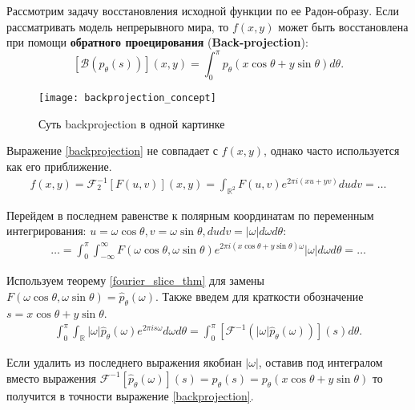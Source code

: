 
Рассмотрим задачу восстановления исходной функции по ее Радон-образу. Если рассматривать модель непрерывного мира, то $f(x, y)$ может быть восстановлена при помощи \textbf{обратного проецирования} (\textbf{Back-projection}):
\begin{equation}
\label{backprojection}
    \left[ \mathcal{B}(p_\theta(s)) \right](x, y) = \int_0^{\pi} p_\theta\left( x\cos\theta + y\sin\theta \right) d\theta.
\end{equation}

\begin{figure}[!h]
    \centering
    \texttt{[image: backprojection\_concept]}
    \caption{Суть backprojection в одной картинке}
\end{figure}

Выражение \eqref{backprojection} не совпадает с $f(x, y)$, однако часто используется как его приближение.
\begin{gather*}
    f(x, y) =
    \mathcal{F}_2^{-1} \left[ F(u, v) \right](x, y) =
    \int_{\mathbb{R}^2} F(u, v) e^{2\pi i (xu + yv)} du dv = \dots
\end{gather*}

Перейдем в последнем равенстве к полярным координатам по переменным интегрирования: $u = \omega\cos\theta, v = \omega\sin\theta, du dv = |\omega| d\omega d\theta$:
\begin{gather*}
    \dots =
    \int_{0}^{\pi} \int_{-\infty}^{\infty} F(\omega\cos\theta, \omega\sin\theta) e^{2\pi i \left( x \cos\theta + y\sin\theta \right)\omega} |\omega| d\omega d \theta = \dots
\end{gather*}

Используем теорему \ref{fourier_slice_thm} для замены $F(\omega\cos\theta, \omega\sin\theta) = \hat{p}_{\theta}(\omega)$. Также введем для краткости обозначение $s = x\cos\theta + y\sin\theta$.
\begin{gather*}
    \int_{0}^{\pi} \int_{\mathbb{R}} |\omega| \hat{p}_{\theta}(\omega) e^{2\pi i s \omega} d\omega d\theta =
    \int_{0}^{\pi} \left[ \mathcal{F}^{-1} \left( |\omega| \hat{p}_\theta(\omega) \right) \right](s) d\theta.
\end{gather*}

Если удалить из последнего выражения якобиан $|\omega|$, оставив под интегралом вместо выражения $\mathcal{F}^{-1}\left[ \hat{p}_\theta(\omega) \right](s) = p_\theta(s) = p_\theta\left( x\cos\theta + y\sin\theta \right)$ то получится в точности выражение \eqref{backprojection}.
